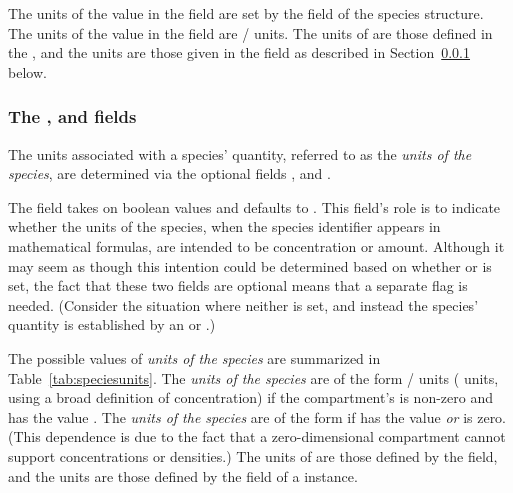 The units of the value in the  field are set
by the  field of the species structure.  The
units of the value in the  field are
/ units.  The units of
 are those defined in the
, and the  units are those
given in the  field as described in
Section~\ref{sec:species-units} below.


\subsubsection{The ,  and
     fields}
\label{sec:species-units}

The units associated with a species' quantity, referred to as the
\emph{units of the species}, are determined via the optional
fields ,  and
.

The field  takes on boolean values
and defaults to .  This field's role is to indicate
whether the units of the species, when the species identifier
appears in mathematical formulas, are intended to be concentration
or amount.  Although it may seem as though this intention could be
determined based on whether  or
 is set, the fact that these two fields are
optional means that a separate flag is needed.  (Consider the
situation where neither is set, and instead the species' quantity
is established by an \InitialAssignment or \AssignmentRule.)

The possible values of \emph{units of the species} are summarized
in Table~\ref{tab:speciesunits}.  The \emph{units of the species}
are of the form / units (\ie
{} units, using a broad definition of
concentration) if the compartment's  is
non-zero and  has the value
.  The \emph{units of the species} are of the form
 if  has the
value  \emph{or}  is zero.
(This dependence is due to the fact that a zero-dimensional
compartment cannot support concentrations or densities.)  The
units of  are those defined by the
 field, and the  units are
those defined by the  field of a \Species
instance.

